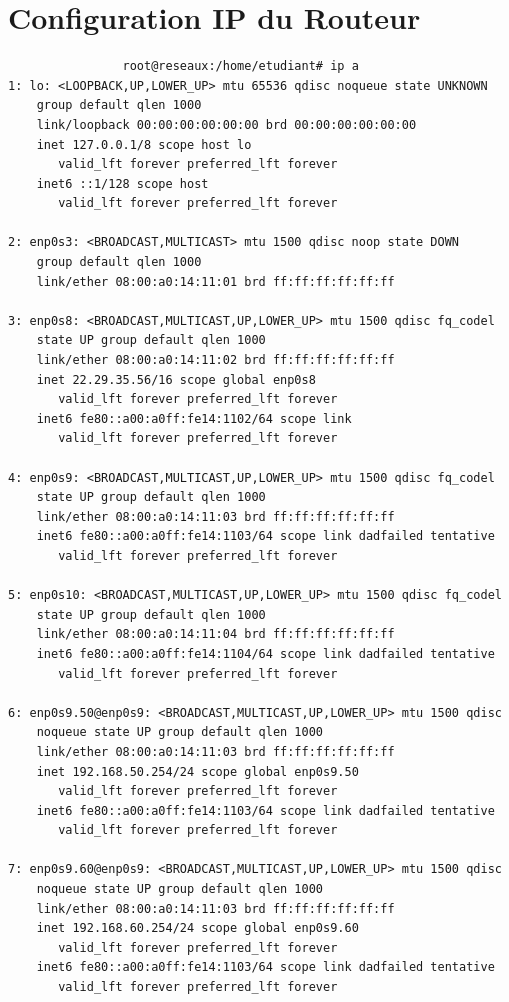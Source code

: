 \documentclass[a4paper,12pt,openany]{report}
\begin{document}
        \section{Configuration IP du Routeur}
            \begin{verbatim}
                root@reseaux:/home/etudiant# ip a
1: lo: <LOOPBACK,UP,LOWER_UP> mtu 65536 qdisc noqueue state UNKNOWN 
    group default qlen 1000
    link/loopback 00:00:00:00:00:00 brd 00:00:00:00:00:00
    inet 127.0.0.1/8 scope host lo
       valid_lft forever preferred_lft forever
    inet6 ::1/128 scope host 
       valid_lft forever preferred_lft forever

2: enp0s3: <BROADCAST,MULTICAST> mtu 1500 qdisc noop state DOWN 
    group default qlen 1000
    link/ether 08:00:a0:14:11:01 brd ff:ff:ff:ff:ff:ff

3: enp0s8: <BROADCAST,MULTICAST,UP,LOWER_UP> mtu 1500 qdisc fq_codel 
    state UP group default qlen 1000
    link/ether 08:00:a0:14:11:02 brd ff:ff:ff:ff:ff:ff
    inet 22.29.35.56/16 scope global enp0s8
       valid_lft forever preferred_lft forever
    inet6 fe80::a00:a0ff:fe14:1102/64 scope link 
       valid_lft forever preferred_lft forever

4: enp0s9: <BROADCAST,MULTICAST,UP,LOWER_UP> mtu 1500 qdisc fq_codel 
    state UP group default qlen 1000
    link/ether 08:00:a0:14:11:03 brd ff:ff:ff:ff:ff:ff
    inet6 fe80::a00:a0ff:fe14:1103/64 scope link dadfailed tentative 
       valid_lft forever preferred_lft forever

5: enp0s10: <BROADCAST,MULTICAST,UP,LOWER_UP> mtu 1500 qdisc fq_codel 
    state UP group default qlen 1000
    link/ether 08:00:a0:14:11:04 brd ff:ff:ff:ff:ff:ff
    inet6 fe80::a00:a0ff:fe14:1104/64 scope link dadfailed tentative 
       valid_lft forever preferred_lft forever

6: enp0s9.50@enp0s9: <BROADCAST,MULTICAST,UP,LOWER_UP> mtu 1500 qdisc 
    noqueue state UP group default qlen 1000
    link/ether 08:00:a0:14:11:03 brd ff:ff:ff:ff:ff:ff
    inet 192.168.50.254/24 scope global enp0s9.50
       valid_lft forever preferred_lft forever
    inet6 fe80::a00:a0ff:fe14:1103/64 scope link dadfailed tentative 
       valid_lft forever preferred_lft forever

7: enp0s9.60@enp0s9: <BROADCAST,MULTICAST,UP,LOWER_UP> mtu 1500 qdisc 
    noqueue state UP group default qlen 1000
    link/ether 08:00:a0:14:11:03 brd ff:ff:ff:ff:ff:ff
    inet 192.168.60.254/24 scope global enp0s9.60
       valid_lft forever preferred_lft forever
    inet6 fe80::a00:a0ff:fe14:1103/64 scope link dadfailed tentative 
       valid_lft forever preferred_lft forever


\end{verbatim}
\end{document}
